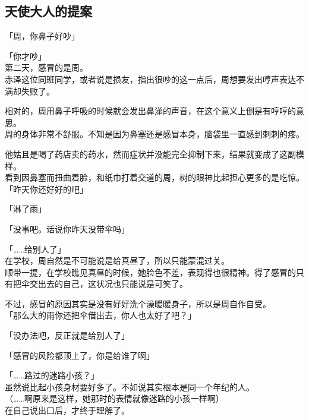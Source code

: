 \subsection{天使大人的提案}

「周，你鼻子好吵」

「你才吵」\\

第二天，感冒的是周。\\

赤泽这位同班同学，或者说是损友，指出很吵的这一点后，周想要发出哼声表达不满却失败了。

相对的，周用鼻子呼吸的时候就会发出鼻涕的声音，在这个意义上倒是有哼哼的意思。\\

周的身体非常不舒服。不知是因为鼻塞还是感冒本身，脑袋里一直感到刺刺的疼。

他姑且是喝了药店卖的药水，然而症状并没能完全抑制下来，结果就变成了这副模样。\\

看到因鼻塞而扭曲着脸，和纸巾打着交道的周，树的眼神比起担心更多的是吃惊。\\

「昨天你还好好的吧」

「淋了雨」

「没事吧。话说你昨天没带伞吗」

「……给别人了」\\

在学校，周自然是不可能说是给真昼了，所以只能蒙混过关。\\

顺带一提，在学校瞧见真昼的时候，她脸色不差，表现得也很精神。得了感冒的只有把伞交出去的自己，这状况也只能说是可笑了。

不过，感冒的原因其实是没有好好洗个澡暖暖身子，所以是周自作自受。\\

「那么大的雨你还把伞借出去，你人也太好了吧？」

「没办法吧，反正就是给别人了」

「感冒的风险都顶上了，你是给谁了啊」

「……路过的迷路小孩？」\\

虽然说比起小孩身材要好多了。不如说其实根本是同一个年纪的人。\\

（……啊原来是这样，她那时的表情就像迷路的小孩一样啊）\\

在自己说出口后，才终于理解了。

